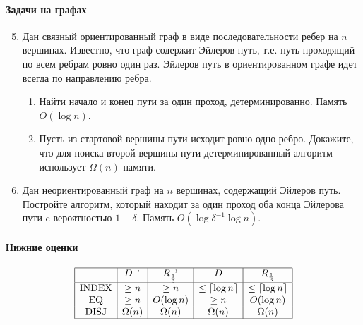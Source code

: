 \documentclass{article}
\begin{document}
\paragraph{Задачи на графах}
\begin{enumerate}
    \setcounter{enumi}{4}
    \item Дан связный ориентированный граф в виде последовательности ребер на $n$ вершинах. Известно, что граф содержит Эйлеров путь, т.е. путь проходящий по всем ребрам ровно один раз. Эйлеров путь в ориентированном графе идет всегда по направлению ребра.
    \begin{enumerate}
        \item Найти начало и конец пути за один проход, детерминированно. Память $O(\log n)$.
        \item Пусть из стартовой вершины пути исходит ровно одно ребро. Докажите, что для поиска второй вершины пути детерминированный алгоритм использует $\Omega(n)$ памяти.
    \end{enumerate}

    \item Дан неориентированный граф на $n$ вершинах, содержащий Эйлеров путь. Постройте алгоритм, который находит за один проход оба конца Эйлерова пути c вероятностью $1 - \delta$. Память $O(\log \delta^{-1} \log n)$.
\end{enumerate}

\pagebreak

\paragraph{Нижние оценки}
$$
\begin{array}{|c|c|c|c|c|}
\hline
                & D^\rightarrow & R^{\rightarrow}_{\frac{1}{3}} & D & R_{\frac{1}{3}} \\
\hline 
\text{INDEX} & \geq n & \geq n & \leq \lceil \log n \rceil & \leq \lceil \log n \rceil \\
\text{EQ} & \geq n & O(\log n) & \geq n & O(\log n) \\
\text{DISJ} & \Omega(n) & \Omega(n) & \Omega(n) & \Omega(n) \\ \hline
\end{array}
$$
\end{document}
